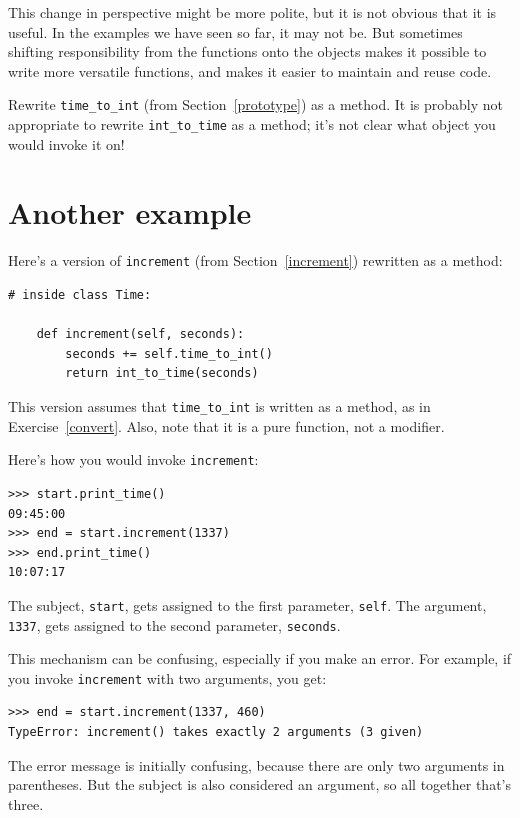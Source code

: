 \documentclass[10pt]{book}
\begin{document}
This change in perspective might be more polite, but it is not obvious
that it is useful.  In the examples we have seen so far, it may not
be.  But sometimes shifting responsibility from the functions onto the
objects makes it possible to write more versatile functions, and makes
it easier to maintain and reuse code.

\begin{ex}
\label{convert}
Rewrite \verb"time_to_int"
(from Section~\ref{prototype}) as a method.  It is probably not
appropriate to rewrite \verb"int_to_time" as a method; it's not
clear what object you would invoke it on!
\end{ex}


\section{Another example}


Here's a version of {\tt increment} (from Section~\ref{increment})
rewritten as a method:

\beforeverb
\begin{verbatim}
# inside class Time:

    def increment(self, seconds):
        seconds += self.time_to_int()
        return int_to_time(seconds)
\end{verbatim}
\afterverb
%
This version assumes that \verb"time_to_int" is written
as a method, as in Exercise~\ref{convert}.  Also, note that
it is a pure function, not a modifier.

Here's how you would invoke {\tt increment}:

\beforeverb
\begin{verbatim}
>>> start.print_time()
09:45:00
>>> end = start.increment(1337)
>>> end.print_time()
10:07:17
\end{verbatim}
\afterverb
%
The subject, {\tt start}, gets assigned to the first parameter,
{\tt self}.  The argument, {\tt 1337}, gets assigned to the
second parameter, {\tt seconds}.

This mechanism can be confusing, especially if you make an error.
For example, if you invoke {\tt increment} with two arguments, you
get:


\beforeverb
\begin{verbatim}
>>> end = start.increment(1337, 460)
TypeError: increment() takes exactly 2 arguments (3 given)
\end{verbatim}
\afterverb
%
The error message is initially confusing, because there are
only two arguments in parentheses.  But the subject is also
considered an argument, so all together that's three.
\end{document}
